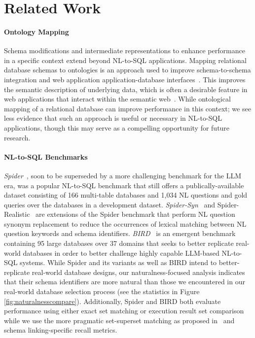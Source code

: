 \section{Related Work}



\paragraph{\textbf{Ontology Mapping}}
Schema modifications and intermediate representations to enhance performance in a specific context extend beyond NL-to-SQL applications.
Mapping relational database schemas to ontologies is an approach used to improve schema-to-schema integration and web application application-database interfaces~\cite{4061430}.
This improves the semantic description of underlying data, which is often a desirable feature in web applications that interact within the semantic web~\cite{7396620}.
While ontological mapping of a relational database can improve performance in this context; we see less evidence that such an approach is useful or necessary in NL-to-SQL applications, though this may serve as a compelling opportunity for future research.

\paragraph{\textbf{NL-to-SQL Benchmarks}}
\emph{Spider}~\cite{Yu&al.18c}, soon to be superseded by a more challenging benchmark for the LLM era, was a popular NL-to-SQL benchmark that still offers a publically-available dataset consisting of 166 multi-table databases and 1,034 NL questions and gold queries over the databases in a development dataset. 
\emph{Spider-Syn}~\cite{gan-etal-2021-towards} and Spider-Realistic~\cite{gan-etal-2021-towards} are extensions of the Spider benchmark that perform NL question synonym replacement to reduce the occurrences of lexical matching between NL question keywords and schema identifiers.
\emph{BIRD}~\cite{li2023llm} is an emergent benchmark containing 95 large databases over 37 domains that seeks to better replicate real-world databases in order to better challenge highly capable LLM-based NL-to-SQL systems.
While Spider and its variants as well as BIRD intend to better-replicate real-world database designs, our naturalness-focused analysis indicates that their schema identifiers are more natural than those we encountered in our real-world database selection process (see the statistics in Figure \ref{fig:naturalnesscompare}).
Additionally, Spider and BIRD both evaluate performance using either exact set matching or execution result set comparison while we use the more pragmatic set-superset matching as proposed in~\cite{floratou2024nl2sql} and schema linking-specific recall metrics.

